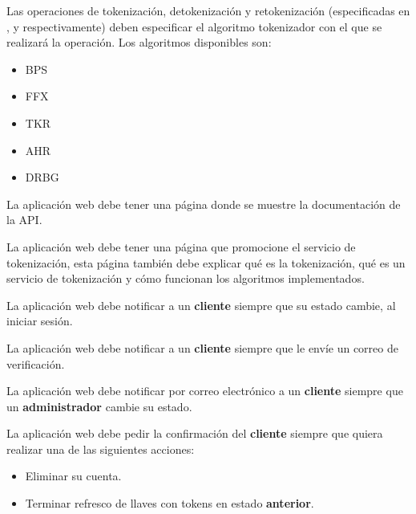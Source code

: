 {
  Las operaciones de tokenización, detokenización y retokenización
  (especificadas en ,
   y 
  respectivamente) deben especificar el algoritmo tokenizador con el que se
  realizará la operación. Los algoritmos disponibles son:
  \begin{itemize}
    \item BPS
    \item FFX
    \item TKR
    \item AHR
    \item DRBG
  \end{itemize}
}

{
  La aplicación web debe tener una página donde se muestre la documentación de
  la API.
}

{
  La aplicación web debe tener una página que promocione el servicio de
  tokenización, esta página también debe explicar qué es la tokenización, qué es
  un servicio de tokenización y cómo funcionan los algoritmos implementados.
}

{
  La aplicación web debe notificar a un \textbf{cliente} siempre que su estado
  cambie, al iniciar sesión.
}

{
  La aplicación web debe notificar a un \textbf{cliente} siempre que le envíe
  un correo de verificación.
}

{
  La aplicación web debe notificar por correo electrónico a un \textbf{cliente}
  siempre que un \textbf{administrador} cambie su estado.
}

{
  La aplicación web debe pedir la confirmación del \textbf{cliente} siempre que
  quiera realizar una de las siguientes acciones:
  \begin{itemize}
    \item Eliminar su cuenta.
    \item Terminar refresco de llaves con tokens en estado \textbf{anterior}.
  \end{itemize}
}

